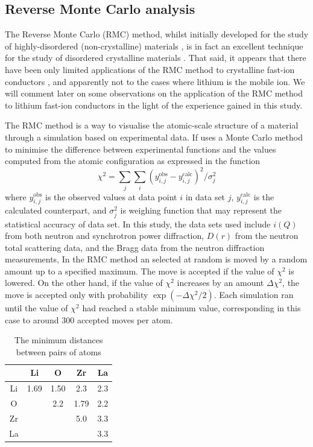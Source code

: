 \documentclass[twoside,twocolumn,9pt]{article}
\begin{document}


\subsection{Reverse Monte Carlo analysis}

The Reverse Monte Carlo (RMC) method, whilst initially developed for the study of highly-disordered (non-crystalline) materials \cite{McGreevy:1988bu}, 
is in fact an excellent technique for the study of disordered crystalline materials \cite{Keen:2005dd}. 
That said, it appears that there have been only limited applications of the RMC method to crystalline fast-ion conductors \cite{Adams:2000ez, Swenson:2001if, Adams:2002ga,Adams:2005ds}, 
and apparently not to the cases where lithium is the mobile ion. We will comment later on some observations on the application of the RMC method to lithium fast-ion conductors 
in the light of the experience gained in this study.

The RMC method is a way to visualise the atomic-scale structure of a material through a simulation based on experimental data. If uses a Monte Carlo method to minimise the difference between experimental functions and the values computed from the atomic configuration as expressed in the function
\begin{equation}
\chi^2=\sum_{j}\sum_{i}(y^ \mathrm{obs}_{i,j}-y^ \mathrm{calc}_{i,j})^2/\sigma^2_{j}
\end{equation}
where $y^\mathrm{obs}_{i,j}$ is the observed values at data point $i$ in data set $j$, $y^ \mathrm{calc}_{i,j}$ is the calculated counterpart, and  $\sigma^2_{j}$ is weighing function that may represent the statistical accuracy of data set. In this study, the data sets used include $i(Q)$ from both neutron and  synchrotron power diffraction, $D(r)$ from the neutron total scattering data, and the Bragg data from the neutron diffraction measurements, In the RMC method an selected at random is moved by a random amount up to a specified maximum. The move is accepted if the value of $\chi^2$ is lowered. On the other hand, if the value of $\chi^2$ increases by an amount $\Delta \chi^2$, the move is accepted only with probability $\exp(-\Delta \chi^2/2)$. Each simulation ran until the value of $\chi^2$ had reached a stable minimum value, corresponding in this case to around 300 accepted moves per atom.

\begin{table}[t]
\centering
\caption{The minimum distances between pairs of atoms} \label{tab:min_dis}
\begin{tabular}{c|cccc}
\hline
   & Li & O & Zr & La \\
\hline
Li & 1.69 & 1.50 & 2.3 & 2.3 \\
O  &      & 2.2  & 1.79& 2.2 \\
Zr &      &      & 5.0 & 3.3 \\
La &      &      &     & 3.3 \\
\hline
\end{tabular}
\end{table}
\end{document}
